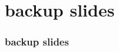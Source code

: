 \date{}
\title{}
\date{}

\begin{frame}
    \titlepage
\end{frame}






\section{backup slides}

\begin{frame}
\frametitle{backup slides}
\end{frame}


